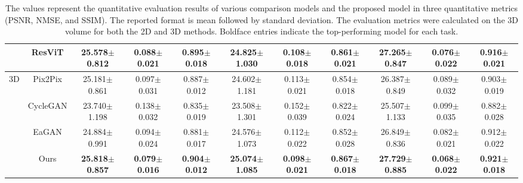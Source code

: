 \documentclass[10pt,twocolumn,letterpaper]{article}
\begin{document}
\begin{table*} [ht]
{\begin{tabular}{ccccccccccc}
             & ResViT & 25.578\footnotesize{$\pm$0.812} & 0.088\footnotesize{$\pm$0.021} & 0.895\footnotesize{$\pm$0.018} & 24.825\footnotesize{$\pm$1.030} & 0.108\footnotesize{$\pm$0.018} & 0.861\footnotesize{$\pm$0.021} & 27.265\footnotesize{$\pm$0.847} & 0.076\footnotesize{$\pm$0.022} & 0.916\footnotesize{$\pm$0.021}   \\
            \midrule \multirow{4}{*}{3D}
             & Pix2Pix & 25.181\footnotesize{$\pm$0.861} & 0.097\footnotesize{$\pm$0.031} & 0.887\footnotesize{$\pm$0.012} & 24.602\footnotesize{$\pm$1.181} & 0.113\footnotesize{$\pm$0.021} & 0.854\footnotesize{$\pm$0.018} & 26.387\footnotesize{$\pm$0.849} & 0.089\footnotesize{$\pm$0.032} & 0.903\footnotesize{$\pm$0.019}   \\

             & CycleGAN & 23.740\footnotesize{$\pm$1.198} & 0.138\footnotesize{$\pm$0.032} & 0.835\footnotesize{$\pm$0.019} & 23.508\footnotesize{$\pm$1.301} & 0.152\footnotesize{$\pm$0.039} & 0.822\footnotesize{$\pm$0.024} & 25.507\footnotesize{$\pm$1.133} & 0.099\footnotesize{$\pm$0.035} & 0.882\footnotesize{$\pm$0.028}   \\

             & EaGAN & 24.884\footnotesize{$\pm$0.991} & 0.094\footnotesize{$\pm$0.024} & 0.881\footnotesize{$\pm$0.017} & 24.576\footnotesize{$\pm$1.073} & 0.112\footnotesize{$\pm$0.022} & 0.852\footnotesize{$\pm$0.028} & 26.849\footnotesize{$\pm$0.836} & 0.082\footnotesize{$\pm$0.021} & 0.912\footnotesize{$\pm$0.022}   \\

             & Ours & \textbf{25.818\footnotesize{$\pm$0.857}} & \textbf{0.079\footnotesize{$\pm$0.016}} & \textbf{0.904\footnotesize{$\pm$0.012}} & \textbf{25.074\footnotesize{$\pm$1.085}} & \textbf{0.098\footnotesize{$\pm$0.021}} & \textbf{0.867\footnotesize{$\pm$0.018}} & \textbf{27.729\footnotesize{$\pm$0.885}} & \textbf{0.068\footnotesize{$\pm$0.022}} & \textbf{0.921\footnotesize{$\pm$0.018}}  \\

            \bottomrule
        \end{tabular}
    }
    \vspace{-3pt}
    \caption{ The values represent the quantitative evaluation results of various comparison models and the proposed model in three quantitative metrics (PSNR, NMSE, and SSIM). The reported format is mean followed by standard deviation. The evaluation metrics were calculated on the 3D volume for both the 2D and 3D methods. Boldface entries indicate the top-performing model for each task.}
    \label{table1}
    \vspace{-6pt}
\end{table*}
\end{document}
